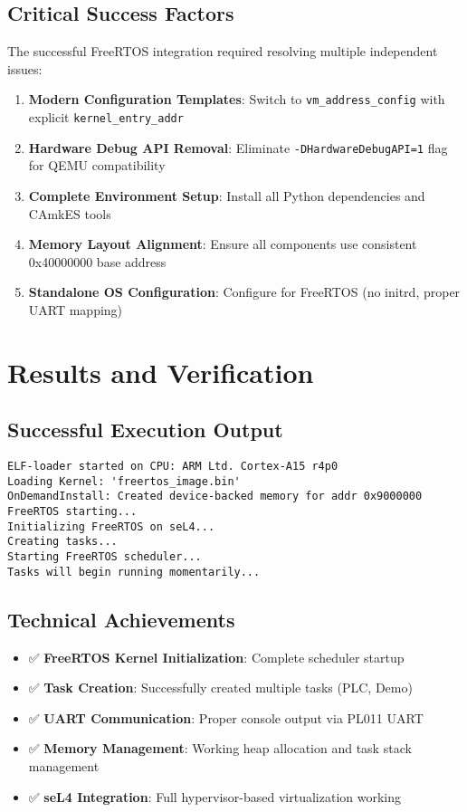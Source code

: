\documentclass[12pt]{article}
\begin{document}
\subsection{Critical Success Factors}

The successful FreeRTOS integration required resolving multiple independent issues:

\begin{enumerate}
\item \textbf{Modern Configuration Templates}: Switch to \texttt{vm\_address\_config} with explicit \texttt{kernel\_entry\_addr}
\item \textbf{Hardware Debug API Removal}: Eliminate \texttt{-DHardwareDebugAPI=1} flag for QEMU compatibility
\item \textbf{Complete Environment Setup}: Install all Python dependencies and CAmkES tools
\item \textbf{Memory Layout Alignment}: Ensure all components use consistent 0x40000000 base address
\item \textbf{Standalone OS Configuration}: Configure for FreeRTOS (no initrd, proper UART mapping)
\end{enumerate}

\section{Results and Verification}

\subsection{Successful Execution Output}

\begin{lstlisting}[caption=FreeRTOS Successfully Running on seL4]
ELF-loader started on CPU: ARM Ltd. Cortex-A15 r4p0
Loading Kernel: 'freertos_image.bin'
OnDemandInstall: Created device-backed memory for addr 0x9000000
FreeRTOS starting...
Initializing FreeRTOS on seL4...
Creating tasks...  
Starting FreeRTOS scheduler...
Tasks will begin running momentarily...
\end{lstlisting}

\subsection{Technical Achievements}

\begin{itemize}
\item ✅ \textbf{FreeRTOS Kernel Initialization}: Complete scheduler startup
\item ✅ \textbf{Task Creation}: Successfully created multiple tasks (PLC, Demo)
\item ✅ \textbf{UART Communication}: Proper console output via PL011 UART
\item ✅ \textbf{Memory Management}: Working heap allocation and task stack management
\item ✅ \textbf{seL4 Integration}: Full hypervisor-based virtualization working
\end{itemize}
\end{document}
